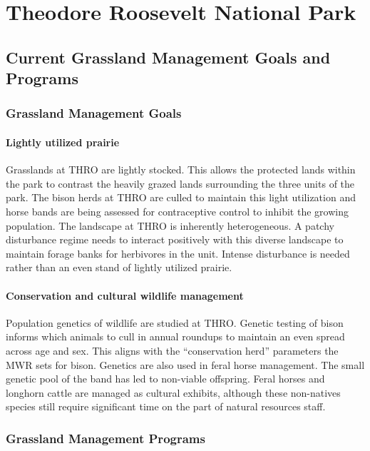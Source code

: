 \section{Theodore Roosevelt National Park}

\subsection{Current Grassland Management Goals and Programs}

\subsubsection{Grassland Management Goals}

\paragraph{Lightly utilized prairie}
Grasslands at THRO are lightly stocked. 
This allows the protected lands within the park to contrast the heavily grazed lands surrounding the three units of the park. 
The bison herds at THRO are culled to maintain this light utilization and horse bands are being assessed for contraceptive control to inhibit the growing population. 
The landscape at THRO is inherently heterogeneous. 
A patchy disturbance regime needs to interact positively with this diverse landscape to maintain forage banks for herbivores in the unit. 
Intense disturbance is needed rather than an even stand of lightly utilized prairie.

\paragraph{Conservation and cultural wildlife management} 
Population genetics of wildlife are studied at THRO. 
Genetic testing of bison informs which animals to cull in annual roundups to maintain an even spread across age and sex. 
This aligns with the ``conservation herd'' parameters the MWR sets for bison. 
Genetics are also used in feral horse management. 
The small genetic pool of the band has led to non-viable offspring. 
Feral horses and longhorn cattle are managed as cultural exhibits, although these non-natives species still require significant time on the part of natural resources staff.

\subsubsection{Grassland Management Programs}

